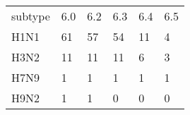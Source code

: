 \begin{tabular}{L{.75in}|L{.25in}|L{.60in}|L{.6in}|L{.6in}|L{.6in}}\hline
subtype&6.0&6.2&6.3&6.4&6.5\\
H1N1&61&57&54&11&4\\
H3N2&11&11&11&6&3\\
H7N9&1&1&1&1&1\\
H9N2&1&1&0&0&0\\
\hline\end{tabular}
